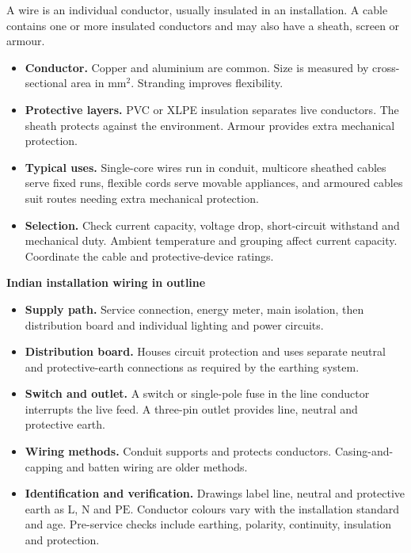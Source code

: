 \documentclass[12pt,a4paper]{article}
\begin{document}
\begin{tcolorbox}[defbox,title={Wire and cable}]
A wire is an individual conductor, usually insulated in an installation. A cable contains one or more insulated conductors and may also have a sheath, screen or armour.
\end{tcolorbox}

\begin{itemize}[leftmargin=*, itemsep=3pt, topsep=4pt]
  \item \textbf{Conductor.} Copper and aluminium are common. Size is measured by cross-sectional area in \(\mathrm{mm^2}\). Stranding improves flexibility.
  \item \textbf{Protective layers.} PVC or XLPE insulation separates live conductors. The sheath protects against the environment. Armour provides extra mechanical protection.
  \item \textbf{Typical uses.} Single-core wires run in conduit, multicore sheathed cables serve fixed runs, flexible cords serve movable appliances, and armoured cables suit routes needing extra mechanical protection.
  \item \textbf{Selection.} Check current capacity, voltage drop, short-circuit withstand and mechanical duty. Ambient temperature and grouping affect current capacity. Coordinate the cable and protective-device ratings.
\end{itemize}

\textbf{Indian installation wiring in outline}
\begin{itemize}[leftmargin=*, itemsep=3pt, topsep=4pt]
  \item \textbf{Supply path.} Service connection, energy meter, main isolation, then distribution board and individual lighting and power circuits.
  \item \textbf{Distribution board.} Houses circuit protection and uses separate neutral and protective-earth connections as required by the earthing system.
  \item \textbf{Switch and outlet.} A switch or single-pole fuse in the line conductor interrupts the live feed. A three-pin outlet provides line, neutral and protective earth.
  \item \textbf{Wiring methods.} Conduit supports and protects conductors. Casing-and-capping and batten wiring are older methods.
  \item \textbf{Identification and verification.} Drawings label line, neutral and protective earth as \(\mathrm{L}\), \(\mathrm{N}\) and \(\mathrm{PE}\). Conductor colours vary with the installation standard and age. Pre-service checks include earthing, polarity, continuity, insulation and protection.
\end{itemize}
\end{document}
